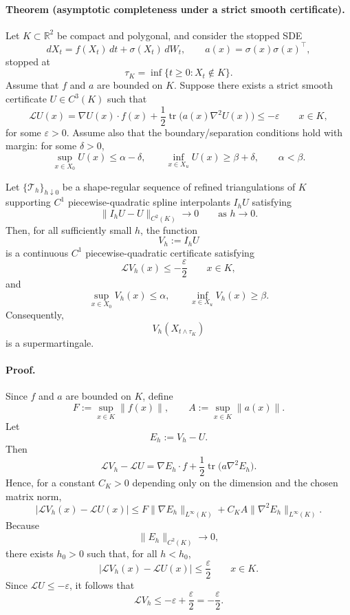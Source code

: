 \paragraph{Theorem (asymptotic completeness under a strict smooth certificate).}
Let \(K\subset\mathbb R^2\) be compact and polygonal, and consider the stopped
SDE
\[
  dX_t=f(X_t)\,dt+\sigma(X_t)\,dW_t,
  \qquad
  a(x)=\sigma(x)\sigma(x)^\top,
\]
stopped at
\[
  \tau_K=\inf\{t\ge0:X_t\notin K\}.
\]
Assume that \(f\) and \(a\) are bounded on \(K\).  Suppose there exists a
strict smooth certificate \(U\in C^3(K)\) such that
\[
  \mathcal LU(x)
  =
  \nabla U(x)\cdot f(x)
  +
  \frac12\operatorname{tr}\!\bigl(a(x)\nabla^2U(x)\bigr)
  \le -\varepsilon
  \qquad x\in K,
\]
for some \(\varepsilon>0\).  Assume also that the boundary/separation
conditions hold with margin: for some \(\delta>0\),
\[
  \sup_{x\in X_0}U(x)\le \alpha-\delta,
  \qquad
  \inf_{x\in X_u}U(x)\ge \beta+\delta,
  \qquad
  \alpha<\beta.
\]

Let \(\{\mathcal T_h\}_{h\downarrow0}\) be a shape-regular sequence of
refined triangulations of \(K\) supporting \(C^1\) piecewise-quadratic spline
interpolants \(I_hU\) satisfying
\[
  \|I_hU-U\|_{C^2(K)}\to0
  \qquad\text{as }h\to0.
\]
Then, for all sufficiently small \(h\), the function
\[
  V_h:=I_hU
\]
is a continuous \(C^1\) piecewise-quadratic certificate satisfying
\[
  \mathcal LV_h(x)\le -\frac{\varepsilon}{2}
  \qquad x\in K,
\]
and
\[
  \sup_{x\in X_0}V_h(x)\le \alpha,
  \qquad
  \inf_{x\in X_u}V_h(x)\ge \beta.
\]
Consequently,
\[
  V_h(X_{t\wedge\tau_K})
\]
is a supermartingale.

\paragraph{Proof.}
Since \(f\) and \(a\) are bounded on \(K\), define
\[
  F:=\sup_{x\in K}\|f(x)\|,
  \qquad
  A:=\sup_{x\in K}\|a(x)\|.
\]
Let
\[
  E_h:=V_h-U.
\]
Then
\[
  \mathcal LV_h-\mathcal LU
  =
  \nabla E_h\cdot f
  +
  \frac12\operatorname{tr}\!\bigl(a\nabla^2E_h\bigr).
\]
Hence, for a constant \(C_K>0\) depending only on the dimension and the chosen
matrix norm,
\[
  |\mathcal LV_h(x)-\mathcal LU(x)|
  \le
  F\|\nabla E_h\|_{L^\infty(K)}
  +
  C_K A\|\nabla^2E_h\|_{L^\infty(K)}.
\]
Because
\[
  \|E_h\|_{C^2(K)}\to0,
\]
there exists \(h_0>0\) such that, for all \(h<h_0\),
\[
  |\mathcal LV_h(x)-\mathcal LU(x)|
  \le \frac{\varepsilon}{2}
  \qquad x\in K.
\]
Since \(\mathcal LU\le-\varepsilon\), it follows that
\[
  \mathcal LV_h
  \le
  -\varepsilon+\frac{\varepsilon}{2}
  =
  -\frac{\varepsilon}{2}.
\]

